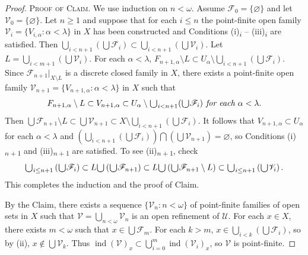 \documentclass[main.tex]{subfiles}
\begin{document}
\begin{proof}
\noindent\textsc{Proof of Claim}. We use induction on $n < \omega$. Assume 
$\mathscr{F}_0 = \{ \varnothing \}$ and let $\mathscr{V}_0 = \{ \varnothing \}$. 
Let $n \ge 1$ and suppose that for each $i \le n$ the point-finite open family 
$\mathscr{V}_i = \{V_{i,\alpha}: \alpha < \lambda\}$ in $X$ has been constructed and Conditions
(i)\textsubscript{$i$} -- (iii)\textsubscript{$i$} are satisfied.
Then $\bigcup_{i < n+1} (\bigcup \mathscr{F}_i) \subset \bigcup_{i < n+1} (\bigcup \mathscr{V}_i)$. 
Let $L = \bigcup_{i < m+1} (\bigcup \mathscr{V}_i)$.
For each $\alpha < \lambda$, 
$F_{n+1,\alpha} \setminus L \subset 
U_\alpha \setminus \bigcup_{i < n+1} (\bigcup \mathscr{F}_i)$. 
Since $\mathscr{F}_{n+1}|_{X\setminus L}$ is a discrete closed family in $X$,  there exists a point-finite open family $\mathscr{V}_{n+1} = \{V_{n+1,\alpha}: \alpha < \lambda\}$ in $X$ 
such that
$$F_{n+1,\alpha} \setminus L \subset 
  V_{n+1,\alpha} \subset 
  U_\alpha \setminus \raisebox{-2pt}{\scalebox{1.5}{$\cup$}}_{i < n+1} (\raisebox{-2pt}{\scalebox{1.5}{$\cup$}} \mathscr{F}_i) \textit{ for each } \alpha < \lambda.$$
Then $\bigcup \mathscr{F}_{n+1} \setminus L 
\subset \bigcup \mathscr{V}_{n+1} \subset 
X \setminus \bigcup_{i < n+1} (\bigcup \mathscr{F}_i)$.
It follows that $V_{n+1, \alpha}\subset U_\alpha$ for each $\alpha < \lambda$ and
$(\bigcup_{i < n+1} (\bigcup \mathscr{F}_i))\bigcap (\bigcup\mathscr{V}_{n+1}) = \varnothing$, 
so  Conditions (i)\textsubscript{$n+1$} and (iii)\textsubscript{$n+1$}
are satisfied. To see (ii)\textsubscript{$n+1$}, check
$$\raisebox{-2pt}{\scalebox{1.5}{$\cup$}}_{i \le n+1} \left(\raisebox{-2pt}{\scalebox{1.5}{$\cup$}} \mathscr{F}_i\right) 
\subset L \raisebox{-2pt}{\scalebox{1.5}{$\cup$}}
\left(\raisebox{-2pt}{\scalebox{1.5}{$\cup$}}\mathscr{F}_{n+1}\right)
\subset L \raisebox{-2pt}{\scalebox{1.5}{$\cup$}}
\left(\raisebox{-2pt}{\scalebox{1.5}{$\cup$}}\mathscr{F}_{n+1}\setminus L\right) 
 \subset \raisebox{-2pt}{\scalebox{1.5}{$\cup$}}_{i \le n+1} \left(\raisebox{-2pt}{\scalebox{1.5}{$\cup$}} \mathscr{V}_i\right).$$
This completes the induction and the proof of Claim.

By the Claim,  there exists a sequence $\{\mathscr{V}_n: n < \omega\}$ of 
point-finite families of open sets in $X$ such that 
$\mathscr{V} = \bigcup_{n<\omega} \mathscr{V}_n$ is an open refinement of $\mathscr{U}$. 
For each $x \in X$,  there exists $m < \omega$ such that $x \in \bigcup \mathscr{F}_m$.
For each $k > m$, $x\in \bigcup_{i < k} \left(\bigcup \mathscr{F}_i\right)$,
so by (ii), $x\notin \bigcup\mathscr{V}_k$. Thus 
$\operatorname{ind}(\mathscr{V})_x\subset  
\bigcup_{i=0}^{m} \operatorname{ind}(\mathscr{V}_i)_x$,  so $\mathscr{V}$ is point-finite.
\end{proof}
\end{document}
